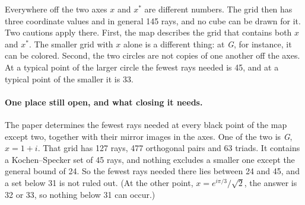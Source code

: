 \documentclass[11pt]{article}
\begin{document}
Everywhere off the two axes $x$ and $x^{*}$ are different numbers.  The grid then has three
coordinate values and in general 145 rays, and no cube can be drawn for it.  Two cautions
apply there.  First, the map describes the grid that contains both $x$ and $x^{*}$.  The
smaller grid with $x$ alone is a different thing: at \textit{G}, for instance, it can be
colored.  Second, the two circles are not copies of one another off the axes.  At a typical
point of the larger circle the fewest rays needed is 45, and at a typical point of the smaller
it is 33.

\paragraph{One place still open, and what closing it needs.}
The paper determines the fewest rays needed at every black point of the map except two, together with their mirror images in the
axes.  One of the two is \textit{G}, $x=1+i$.  That grid has 127 rays, 477 orthogonal pairs and 63 triads.  It contains a
Kochen--Specker set of 45 rays, and nothing excludes a smaller one except the general bound of
24.  So the fewest rays needed there lies between 24 and 45, and a set below 31 is not ruled
out.  (At the other point, $x=e^{i\pi/3}/\sqrt2$, the answer is 32 or 33, so nothing below 31
can occur.)
\end{document}
